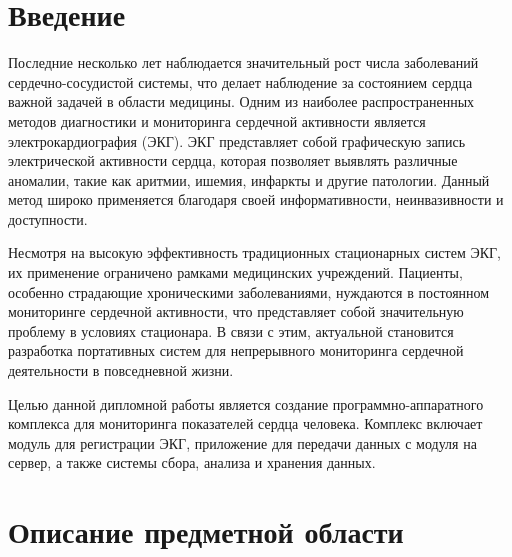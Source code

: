 \documentclass[12pt, russian]{extarticle}
\begin{document}

\begin{spacing}{1.5}

\tableofcontents
\thispagestyle{empty}
\newpage

\pagestyle{plain}
\setcounter{page}{3}

\section{Введение}

Последние несколько лет наблюдается значительный рост числа заболеваний сердечно-сосудистой системы, что делает наблюдение за состоянием сердца важной задачей в области медицины. Одним из наиболее распространенных методов диагностики и мониторинга сердечной активности является электрокардиография (ЭКГ). ЭКГ представляет собой графическую запись электрической активности сердца, которая позволяет выявлять различные аномалии, такие как аритмии, ишемия, инфаркты и другие патологии. Данный метод широко применяется благодаря своей информативности, неинвазивности и доступности.

Несмотря на высокую эффективность традиционных стационарных систем ЭКГ, их применение ограничено рамками медицинских учреждений. Пациенты, особенно страдающие хроническими заболеваниями, нуждаются в постоянном мониторинге сердечной активности, что представляет собой значительную проблему в условиях стационара. В связи с этим, актуальной становится разработка портативных систем для непрерывного мониторинга сердечной деятельности в повседневной жизни.

Целью данной дипломной работы является создание программно-аппаратного комплекса для мониторинга показателей сердца человека. Комплекс включает модуль для регистрации ЭКГ, приложение для передачи данных с модуля на сервер, а также системы сбора, анализа и хранения данных.

\newpage
\section{Описание предметной области}


\end{spacing}
\end{document}

